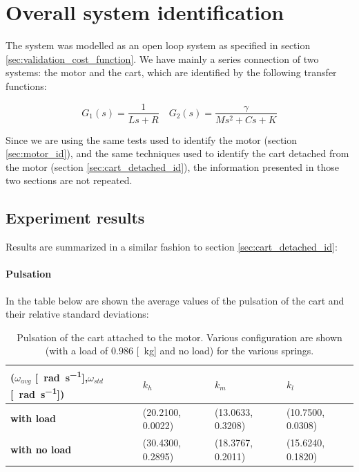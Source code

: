 \section{Overall system identification}
The system was modelled as an open loop system as specified in section \ref{sec:validation_cost_function}.
We have mainly  a series connection of two systems: the motor and the cart, which are identified by the following transfer functions:

$$G_1(s) = \frac{1}{Ls+R} \quad G_2(s) = \frac{\gamma}{Ms^2+Cs+K}$$

Since we are using the same tests used to identify the motor (section \ref{sec:motor_id}), and the same techniques used to identify the cart detached from the motor (section \ref{sec:cart_detached_id}), the information presented in those two sections are not repeated.
\subsection{Experiment results}
Results are summarized in a similar fashion to section \ref{sec:cart_detached_id}:
\paragraph{Pulsation}
In the table below are shown the average values of the pulsation of the cart and their relative standard deviations:
\begin{table}[!h]
\centering


\begin{tabular}{|l|l|l|l|}
\hline
{(\textbf{$\omega_{avg}$} [\SI{}{\radian \per \second}],$\omega_{std}$ [\SI{}{\radian \per \second}])} & \textbf{$k_h$} & \textbf{$k_m$}   & \textbf{$k_l$}   \\ \hline
\textbf{with load}         & (20.2100, 0.0022)    & (13.0633, 0.3208) & (10.7500, 0.0308)      \\ \hline
\textbf{with no load}      & (30.4300, 0.2895)    & (18.3767, 0.2011) & (15.6240, 0.1820) \\ \hline
\end{tabular}

\caption{Pulsation of the cart  attached to the motor. Various configuration are shown (with a load of $0.986$ [\SI{}{\kilo \gram}] and no load) for the various springs. }
\label{table:cart_attached_omega_fl}
\end{table} \\ \\



